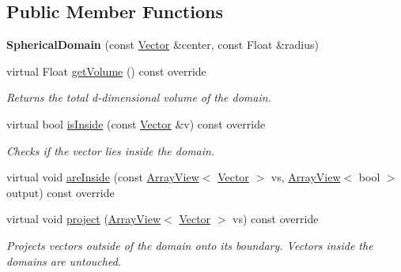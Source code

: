 \subsection*{Public Member Functions}
\begin{DoxyCompactItemize}
\item 
\hypertarget{classSphericalDomain_aa065a14a2c52216a7602ced044e03882}{}\label{classSphericalDomain_aa065a14a2c52216a7602ced044e03882} 
{\bfseries Spherical\+Domain} (const \hyperlink{classBasicVector}{Vector} \&center, const Float \&radius)
\item 
\hypertarget{classSphericalDomain_ae1c88a5c019c868a797e03b411e35dd8}{}\label{classSphericalDomain_ae1c88a5c019c868a797e03b411e35dd8} 
virtual Float \hyperlink{classSphericalDomain_ae1c88a5c019c868a797e03b411e35dd8}{get\+Volume} () const override
\begin{DoxyCompactList}\small\item\em Returns the total d-\/dimensional volume of the domain. \end{DoxyCompactList}\item 
\hypertarget{classSphericalDomain_a5383f0d27d5d3d77cf4d287c6a937a51}{}\label{classSphericalDomain_a5383f0d27d5d3d77cf4d287c6a937a51} 
virtual bool \hyperlink{classSphericalDomain_a5383f0d27d5d3d77cf4d287c6a937a51}{is\+Inside} (const \hyperlink{classBasicVector}{Vector} \&v) const override
\begin{DoxyCompactList}\small\item\em Checks if the vector lies inside the domain. \end{DoxyCompactList}\item 
virtual void \hyperlink{classSphericalDomain_aa5f4f17ecc1fa454da8b30e55bba98bf}{are\+Inside} (const \hyperlink{classArrayView}{Array\+View}$<$ \hyperlink{classBasicVector}{Vector} $>$ vs, \hyperlink{classArrayView}{Array\+View}$<$ bool $>$ output) const override
\item 
\hypertarget{classSphericalDomain_a57524f02db83e73146f6117d25de992c}{}\label{classSphericalDomain_a57524f02db83e73146f6117d25de992c} 
virtual void \hyperlink{classSphericalDomain_a57524f02db83e73146f6117d25de992c}{project} (\hyperlink{classArrayView}{Array\+View}$<$ \hyperlink{classBasicVector}{Vector} $>$ vs) const override
\begin{DoxyCompactList}\small\item\em Projects vectors outside of the domain onto its boundary. Vectors inside the domains are untouched. \end{DoxyCompactList}\end{DoxyCompactItemize}

